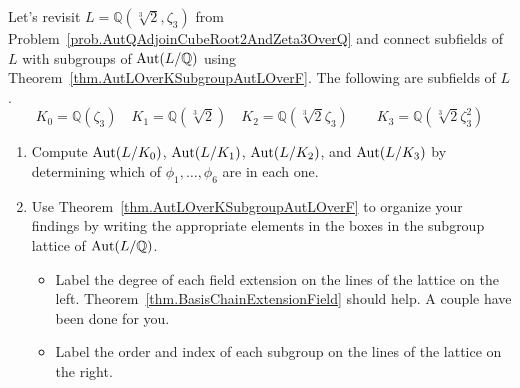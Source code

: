 \begin{problem}\label{prob.AutQAdjoinCubeRoot2AndZeta3OverQLattices}
Let's revisit $L = \mathbb{Q}(\sqrt[3]{2},\zeta_3)$ from Problem~\ref{prob.AutQAdjoinCubeRoot2AndZeta3OverQ} and connect subfields of $L$ with subgroups of $\operatorname{Aut}(L/\mathbb{Q})$ using Theorem~\ref{thm.AutLOverKSubgroupAutLOverF}. The following are subfields of $L$.
\[K_0 = \mathbb{Q}(\zeta_3)\quad K_1 = \mathbb{Q}(\sqrt[3]{2})\quad K_2 = \mathbb{Q}(\sqrt[3]{2}\zeta_3)\quad \quad K_3 = \mathbb{Q}(\sqrt[3]{2}\zeta_3^2)\]
\begin{enumerate}
\item Compute $\operatorname{Aut}(L/K_0)$, $\operatorname{Aut}(L/K_1)$, $\operatorname{Aut}(L/K_2)$, and $\operatorname{Aut}(L/K_3)$ by determining which of  $\phi_1,\ldots,\phi_6$ are in each one.
\item Use Theorem~\ref{thm.AutLOverKSubgroupAutLOverF} to organize your findings by writing the appropriate elements in the boxes in the subgroup lattice of $\operatorname{Aut}(L/\mathbb{Q})$. 
\begin{itemize}
\item Label the degree of each field extension on the lines of the lattice on the left. Theorem~\ref{thm.BasisChainExtensionField} should help. A couple have been done for you.
\item Label the order and index of each subgroup on the lines of the lattice on the right.   
\end{itemize} 
\end{enumerate}
\begin{center}
\end{center}
\end{problem}
